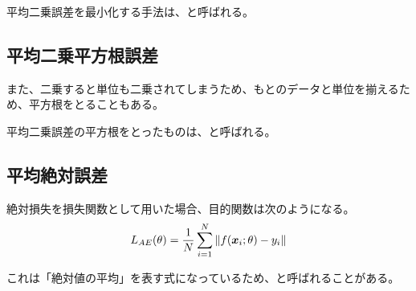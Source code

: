 \documentclass[../../../topic_machine-learning]{subfiles}
\begin{document}
平均二乗誤差を最小化する手法は、と呼ばれる。

\subsection{平均二乗平方根誤差}

また、二乗すると単位も二乗されてしまうため、もとのデータと単位を揃えるため、平方根をとることもある。

平均二乗誤差の平方根をとったものは、と呼ばれる。

\subsection{平均絶対誤差}

絶対損失を損失関数として用いた場合、目的関数は次のようになる。
\begin{equation*}
  L_{AE}(\theta) = \frac{1}{N} \sum_{i=1}^{N} \|f(\vb*{x}_i; \theta) - y_i\|
\end{equation*}

これは「絶対値の平均」を表す式になっているため、と呼ばれることがある。
\end{document}
